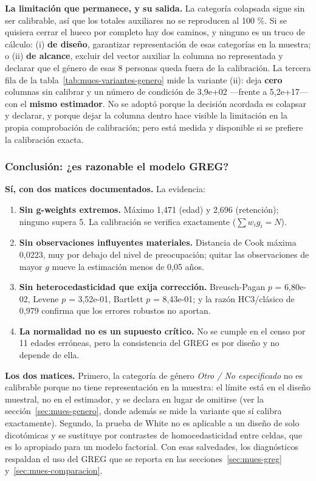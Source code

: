 \textbf{La limitación que permanece, y su salida.} La categoría colapsada sigue
sin ser calibrable, así que los totales auxiliares no se reproducen al 100 \%. Si
se quisiera cerrar el hueco por completo hay dos caminos, y ninguno es un truco de
cálculo: (i) \textbf{de diseño}, garantizar representación de esas categorías en
la muestra; o (ii) \textbf{de alcance}, excluir del vector auxiliar la columna no
representada y declarar que el género de esas 8 personas queda fuera de la
calibración. La tercera fila de la tabla~\ref{tab:mues-variantes-genero} mide la
variante (ii): deja \textbf{cero} columnas sin calibrar y un número de condición
de 3,9e+02 ---frente a 5,2e+17--- con el \textbf{mismo estimador}. No se adoptó
porque la decisión acordada es colapsar y declarar, y porque dejar la columna
dentro hace visible la limitación en la propia comprobación de calibración; pero
está medida y disponible si se prefiere la calibración exacta.

\subsubsection{Conclusión: ¿es razonable el modelo GREG?}

\textbf{Sí, con dos matices documentados.} La evidencia:

\begin{enumerate}
  \item \textbf{Sin g-weights extremos.} Máximo 1,471 (edad) y 2,696 (retención);
        ninguno supera 5. La calibración se verifica exactamente
        ($\sum w_i g_i = N$).
  \item \textbf{Sin observaciones influyentes materiales.} Distancia de Cook
        máxima 0,0223, muy por debajo del nivel de preocupación; quitar las
        observaciones de mayor $g$ mueve la estimación menos de 0,05 años.
  \item \textbf{Sin heterocedasticidad que exija corrección.} Breusch-Pagan
        $p$ = 6,80e-02, Levene $p$ = 3,52e-01, Bartlett $p$ = 8,43e-01; y la razón
        HC3/clásico de 0,979 confirma que los errores robustos no aportan.
  \item \textbf{La normalidad no es un supuesto crítico.} No se cumple en el
        censo por 11 edades erróneas, pero la consistencia del GREG es por diseño
        y no depende de ella.
\end{enumerate}

\textbf{Los dos matices.} Primero, la categoría de género \emph{Otro / No
especificado} no es calibrable porque no tiene representación en la muestra: el
límite está en el diseño muestral, no en el estimador, y se declara en lugar de
omitirse (ver la sección~\ref{sec:mues-genero}, donde además se mide la variante
que sí calibra exactamente). Segundo, la prueba de White no es aplicable a un
diseño de solo dicotómicas y se sustituye por contrastes de homocedasticidad entre
celdas, que es lo apropiado para un modelo factorial. Con esas salvedades, los
diagnósticos respaldan el uso del GREG que se reporta en las
secciones~\ref{sec:mues-greg} y~\ref{sec:mues-comparacion}.

